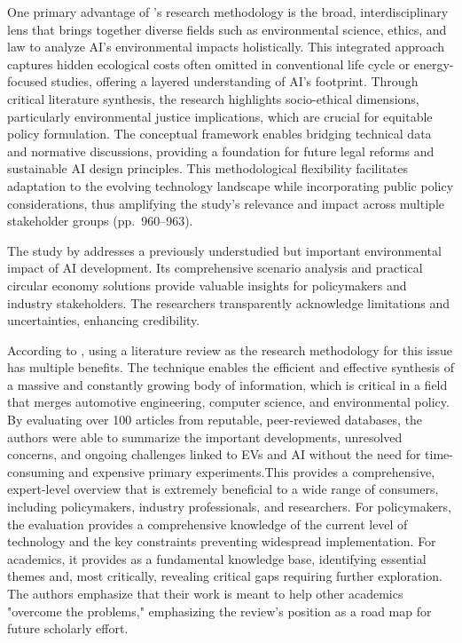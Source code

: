 \documentclass[a4paper, 12pt]{article}
\begin{document}
\par One primary advantage of \citet{Zhuk2023}'s research methodology is the broad, interdisciplinary lens that brings together diverse fields such as environmental science, ethics, and law to analyze AI’s environmental impacts holistically. This integrated approach captures hidden ecological costs often omitted in conventional life cycle or energy-focused studies, offering a layered understanding of AI's footprint. Through critical literature synthesis, the research highlights socio-ethical dimensions, particularly environmental justice implications, which are crucial for equitable policy formulation. The conceptual framework enables bridging technical data and normative discussions, providing a foundation for future legal reforms and sustainable AI design principles. This methodological flexibility facilitates adaptation to the evolving technology landscape while incorporating public policy considerations, thus amplifying the study’s relevance and impact across multiple stakeholder groups (pp.~960--963). \hfill \break
\par The study by \cite{wang_2024_ewaste} addresses a previously understudied but important environmental impact of AI development. Its comprehensive scenario analysis and practical circular economy solutions provide valuable insights for policymakers and industry stakeholders. The researchers transparently acknowledge limitations and uncertainties, enhancing credibility. \hfill \break
\par According to \citet{M.rauf2024}, using a literature review as the research methodology for this issue has multiple benefits. The technique enables the efficient and effective synthesis of a massive and constantly growing body of information, which is critical in a field that merges automotive engineering, computer science, and environmental policy. By evaluating over 100 articles from reputable, peer-reviewed databases, the authors were able to summarize the important developments, unresolved concerns, and ongoing challenges linked to EVs and AI without the need for time-consuming and expensive primary experiments.This provides a comprehensive, expert-level overview that is extremely beneficial to a wide range of consumers, including policymakers, industry professionals, and researchers.  For policymakers, the evaluation provides a comprehensive knowledge of the current level of technology and the key constraints preventing widespread implementation.  For academics, it provides as a fundamental knowledge base, identifying essential themes and, most critically, revealing critical gaps requiring further exploration.  The authors emphasize that their work is meant to help other academics "overcome the problems," emphasizing the review's position as a road map for future scholarly effort.
\end{document}
